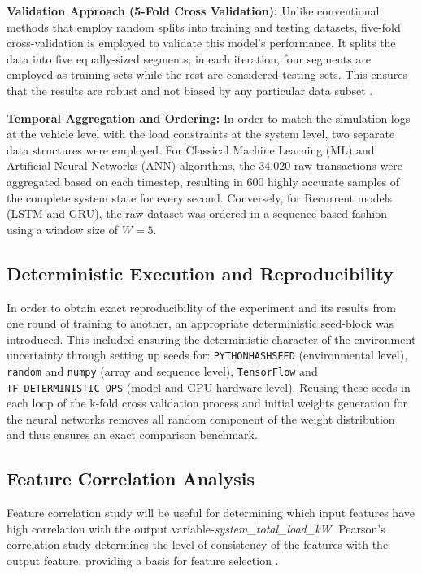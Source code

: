 \documentclass{thesis-library}
\begin{document}
\noindent \textbf{Validation Approach (5-Fold Cross Validation):} Unlike conventional methods that employ random splits into training and testing datasets, five-fold cross-validation is employed to validate this model's performance. It splits the data into five equally-sized segments; in each iteration, four segments are employed as training sets while the rest are considered testing sets. This ensures that the results are robust and not biased by any particular data subset \cite{decision_tree_load2019}.

\noindent \textbf{Temporal Aggregation and Ordering:} In order to match the simulation logs at the vehicle level with the load constraints at the system level, two separate data structures were employed. For Classical Machine Learning (ML) and Artificial Neural Networks (ANN) algorithms, the 34,020 raw transactions were aggregated based on each timestep, resulting in 600 highly accurate samples of the complete system state for every second. Conversely, for Recurrent models (LSTM and GRU), the raw dataset was ordered in a sequence-based fashion using a window size of $W=5$.

\subsection{Deterministic Execution and Reproducibility}

\begin{sloppypar}
In order to obtain exact reproducibility of the experiment and its results from one round of training to another, an appropriate deterministic seed-block was introduced. This included ensuring the deterministic character of the environment uncertainty through setting up seeds for: \texttt{PYTHONHASHSEED} (environmental level), \texttt{random} and \texttt{numpy} (array and sequence level), \texttt{TensorFlow} and \texttt{TF\_DETERMINISTIC\_OPS} (model and GPU hardware level).
Reusing these seeds in each loop of the k-fold cross validation process and initial weights generation for the neural networks removes all random component of the weight distribution and thus ensures an exact comparison benchmark.
\end{sloppypar}

\subsection{Feature Correlation Analysis}

Feature correlation study will be useful for determining which input features have high correlation with the output variable-\textit{system\_total\_load\_kW}. Pearson's correlation study determines the level of consistency of the features with the output feature, providing a basis for feature selection \cite{zhou2019probabilistic}.
\end{document}

